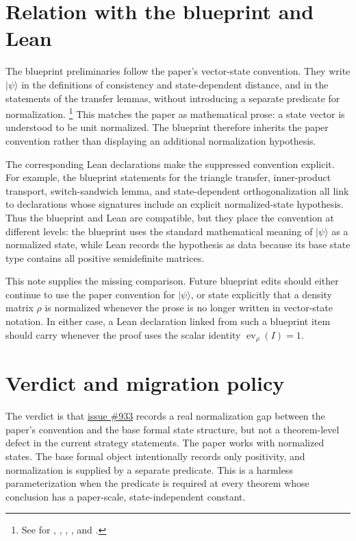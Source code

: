 \documentclass[11pt]{article}
\newcommand{\ev}{\operatorname{ev}}
\begin{document}
\section{Relation with the blueprint and Lean}

The blueprint preliminaries follow the paper's vector-state convention.  They
write $|\psi\rangle$ in the definitions of consistency and state-dependent
distance, and in the statements of the transfer lemmas, without introducing a
separate predicate for normalization.
\footnote{See  for
, , ,
, and .}
This matches the paper as mathematical prose: a state vector is understood to be
unit normalized.  The blueprint therefore inherits the paper convention rather
than displaying an additional normalization hypothesis.

The corresponding Lean declarations make the suppressed convention explicit.
For example, the blueprint statements for the triangle transfer, inner-product
transport, switch-sandwich lemma, and state-dependent orthogonalization all
link to declarations whose signatures include an explicit normalized-state
hypothesis.  Thus the blueprint
and Lean are compatible, but they place the convention at different levels: the
blueprint uses the standard mathematical meaning of $|\psi\rangle$ as a
normalized state, while Lean records the hypothesis as data because its base
state type contains all positive semidefinite matrices.

This note supplies the missing comparison.  Future blueprint edits should either
continue to use the paper convention for $|\psi\rangle$, or state explicitly that
a density matrix \(\rho\) is normalized whenever the prose is no longer written
in vector-state notation.  In either case, a Lean declaration linked from such a
blueprint item should carry  whenever the proof uses the
scalar identity \(\ev_\rho(I)=1\).

\section{Verdict and migration policy}

The verdict is that \href{https://github.com/LionSR/MIPStarRE/issues/933}{issue
\#933} records a real normalization gap between the paper's convention and the
base formal state structure, but not a theorem-level defect in the current
strategy statements. The paper works with normalized states. The base formal
object intentionally records only positivity, and normalization is supplied by a
separate predicate. This is a harmless parameterization when the predicate is
required at every theorem whose conclusion has a paper-scale, state-independent
constant.
\end{document}
